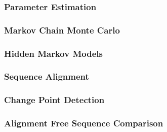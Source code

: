 \documentclass[12pt,a4paper]{article}
\begin{document}
            \subsubsection{Parameter Estimation}
            
            
            \subsubsection{Markov Chain Monte Carlo}
            
            
            \subsubsection{Hidden Markov Models}
             
            
            \subsubsection{Sequence Alignment}
            
            
            \subsubsection{Change Point Detection}
            
            
            
            \subsubsection{Alignment Free Sequence Comparison}
            
            
            
            
            
        
\end{document}
